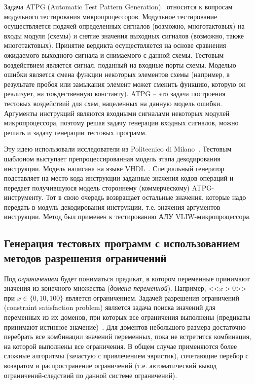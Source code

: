 Задача ATPG (Automatic Test Pattern Generation)~\cite{ATPGbook}
относится к вопросам модульного тестирования микропроцессоров.
Модульное тестирование осуществляется подачей определенных сигналов
(возможно, многотактовых) на входы модуля (схемы) и снятие значения
выходных сигналов (возможно, также многотактовых). Принятие вердикта
осуществляется на основе сравнения ожидаемого выходного сигнала и
снимаемого с данной схемы. Тестовым воздействием является сигнал,
поданный на входные порты схемы. Моделью ошибки является смена
функции некоторых элементов схемы (например, в результате пробоя или
замыкания элемент может сменить функцию, которую он реализует, на
тождественную константу). ATPG -- это задача построения тестовых
воздействий для схем, нацеленных на данную модель ошибки. Аргументы
инструкций являются входными сигналами некоторых модулей
микропроцессора, поэтому решая задачу генерации входных сигналов,
можно решать и задачу генерации тестовых программ.

Эту идею использовали исследователи из Politecnico di
Milano~\cite{toATPG}. Тестовым шаблоном выступает
препроцессированная модель этапа декодирования инструкции. Модель
написана на языке VHDL~\cite{VHDL}. Специальный генератор
подставляет на место кода инструкции заданные значения кодов
операций и передает получившуюся модель стороннему (коммерческому)
ATPG-инструменту. Тот в свою очередь возвращает остальные значения,
которые надо передать в модуль декодирования инструкции, т.е.
значения аргументов инструкции. Метод был применен к тестированию
АЛУ VLIW-микропроцессора.


\subsection{Генерация тестовых программ с использованием методов
разрешения ограничений}

Под \emph{ограничением} будет пониматься предикат, в котором
переменные принимают значения из конечного множества (\emph{домена переменной}). Например, <<$x >
0$>> при $x \in \{0, 10, 100\}$ является ограничением. Задачей разрешения ограничений
(constraint satisfaction problem) является задача поиска значений
для переменных из их доменов, при которых все ограничения
выполнены (предикаты принимают истинное значение)~\cite{CSP}. Для доментов небольшого размера
достаточно перебрать все комбинации значений переменных, пока не
встретится комбинация, на которой выполнены все ограничения. В общем
случае применяются более сложные алгоритмы (зачастую с привлечением
эвристик), сочетающие перебор с возвратом и распространение
ограничений (т.е. автоматический вывод ограничений-следствий по
данной системе ограничений).

